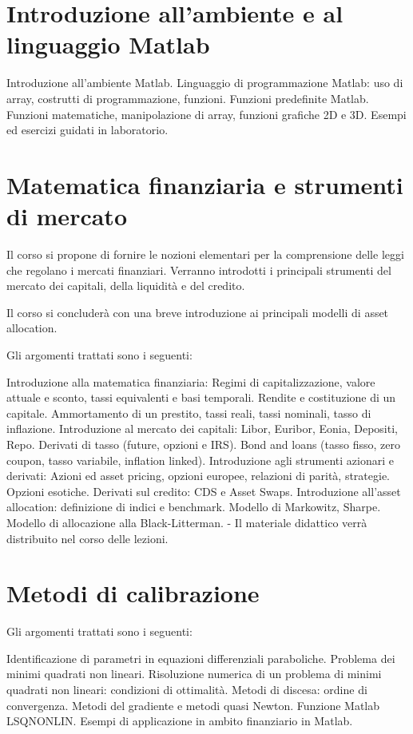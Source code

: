 \section{Introduzione all'ambiente e al linguaggio Matlab}
Introduzione all'ambiente Matlab.
Linguaggio di programmazione Matlab: uso di array, costrutti di programmazione, funzioni.
Funzioni predefinite Matlab. Funzioni matematiche, manipolazione di array, funzioni grafiche 2D e 3D.
Esempi ed esercizi guidati in laboratorio.


\section{Matematica finanziaria e strumenti di mercato}
Il corso si propone di fornire le nozioni elementari per la comprensione delle leggi che regolano i mercati finanziari. Verranno introdotti i principali strumenti del mercato dei capitali, della liquidità e del credito.

Il corso si concluderà con una breve introduzione ai principali modelli di asset allocation.

Gli argomenti trattati sono i seguenti:

Introduzione alla matematica finanziaria: Regimi di capitalizzazione, valore attuale e sconto, tassi equivalenti e basi temporali. Rendite e costituzione di un capitale. Ammortamento di un prestito, tassi reali, tassi nominali, tasso di inflazione.
Introduzione al mercato dei capitali: Libor, Euribor, Eonia, Depositi, Repo. Derivati di tasso (future, opzioni e IRS). Bond and loans (tasso fisso, zero coupon, tasso variabile, inflation linked).
Introduzione agli strumenti azionari e derivati: Azioni ed asset pricing, opzioni europee, relazioni di parità, strategie. Opzioni esotiche. Derivati sul credito: CDS e Asset Swaps.
Introduzione all'asset allocation: definizione di indici e benchmark. Modello di Markowitz, Sharpe. Modello di allocazione alla Black-Litterman.
- Il materiale didattico verrà distribuito nel corso delle lezioni.


\section{Metodi di calibrazione}
Gli argomenti trattati sono i seguenti:

Identificazione di parametri in equazioni differenziali paraboliche. Problema dei minimi quadrati non lineari.
Risoluzione numerica di un problema di minimi quadrati non lineari: condizioni di ottimalità. Metodi di discesa: ordine di convergenza.
Metodi del gradiente e metodi quasi Newton.
Funzione Matlab LSQNONLIN.
Esempi di applicazione in ambito finanziario in Matlab.


